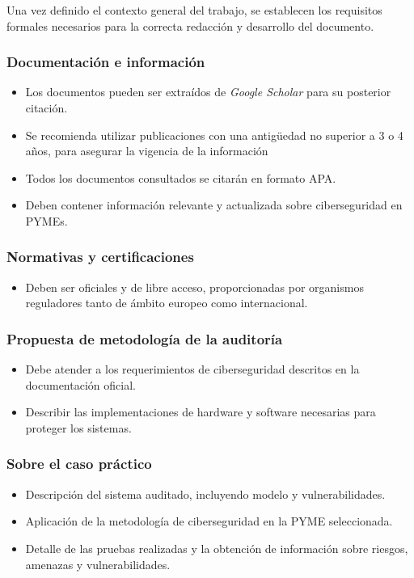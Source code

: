 \documentclass[a4paper, 11pt]{article}
\begin{document}
Una vez definido el contexto general del trabajo, se establecen los requisitos formales necesarios para la correcta redacción y desarrollo del documento.

\subsubsection{Documentación e información}
\begin{itemize}
    \item Los documentos pueden ser extraídos de \textit{Google Scholar} para su posterior citación.
    \item Se recomienda utilizar publicaciones con una antigüedad no superior a 3 o 4 años, para asegurar la vigencia de la información
    \item Todos los documentos consultados se citarán en formato APA.
    \item Deben contener información relevante y actualizada sobre ciberseguridad en PYMEs.
\end{itemize}

\subsubsection{Normativas y certificaciones}
\begin{itemize}
    \item Deben ser oficiales y de libre acceso, proporcionadas por organismos reguladores tanto de ámbito europeo como internacional.
\end{itemize}

\subsubsection{Propuesta de metodología de la auditoría}
\begin{itemize}
    \item Debe atender a los requerimientos de ciberseguridad descritos en la documentación oficial.
    \item Describir las implementaciones de hardware y software necesarias para proteger los sistemas.
\end{itemize}

\subsubsection{Sobre el caso práctico}
\begin{itemize}
    \item Descripción del sistema auditado, incluyendo modelo y vulnerabilidades.
    \item Aplicación de la metodología de ciberseguridad en la PYME seleccionada.
    \item Detalle de las pruebas realizadas y la obtención de información sobre riesgos, amenazas y vulnerabilidades.
\end{itemize}
\end{document}
